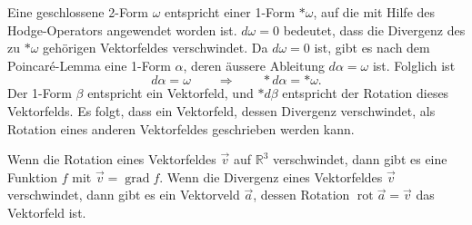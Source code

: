 Eine geschlossene 2-Form $\omega$ entspricht einer 1-Form $\ast\omega$,
auf die mit Hilfe des Hodge-Operators angewendet worden ist.
$d\omega=0$ bedeutet, dass die Divergenz des zu $\ast\omega$
gehörigen Vektorfeldes verschwindet.
Da $d\omega=0$ ist, gibt es nach dem Poincaré-Lemma eine 1-Form $\alpha$,
deren äussere Ableitung $d\alpha=\omega$ ist.
Folglich ist 
\[
d\alpha = \omega
\qquad\Rightarrow\qquad
\ast d\alpha = \ast\omega.
\]
Der 1-Form $\beta$ entspricht ein Vektorfeld, und $\ast d\beta$ entspricht
der Rotation dieses Vektorfelds.
Es folgt, dass ein Vektorfeld, dessen Divergenz verschwindet, als
Rotation eines anderen Vektorfeldes geschrieben werden kann.

\begin{satz}
Wenn die Rotation eines Vektorfeldes $\vec{v}$ auf $\mathbb{R}^3$
verschwindet, dann gibt es eine Funktion $f$ mit
$\vec{v}=\operatorname{grad}f$.
Wenn die Divergenz eines Vektorfeldes $\vec{v}$ verschwindet,
dann gibt es ein Vektorveld $\vec{a}$, dessen Rotation
$\operatorname{rot}\vec{a}=\vec{v}$ das Vektorfeld ist.
\end{satz}

